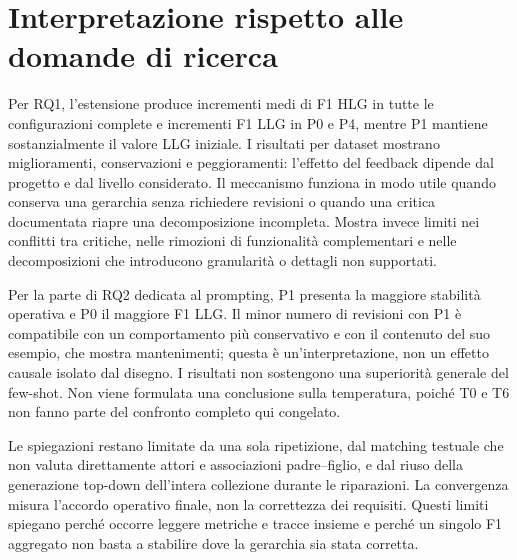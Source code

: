 \section{Interpretazione rispetto alle domande di ricerca}
Per RQ1, l'estensione produce incrementi medi di F1 HLG in tutte
le configurazioni complete e incrementi F1 LLG in P0 e P4, mentre
P1 mantiene sostanzialmente il valore LLG iniziale. I risultati per
dataset mostrano miglioramenti, conservazioni e peggioramenti:
l'effetto del feedback dipende dal progetto e dal livello considerato.
Il meccanismo funziona in modo utile quando conserva una gerarchia
senza richiedere revisioni o quando una critica documentata riapre
una decomposizione incompleta. Mostra invece limiti nei conflitti
tra critiche, nelle rimozioni di funzionalit\`a complementari e nelle
decomposizioni che introducono granularit\`a o dettagli non supportati.

Per la parte di RQ2 dedicata al prompting, P1 presenta la maggiore
stabilit\`a operativa e P0 il maggiore F1 LLG. Il minor numero di
revisioni con P1 \`e compatibile con un comportamento pi\`u conservativo
e con il contenuto del suo esempio, che mostra mantenimenti; questa
\`e un'interpretazione, non un effetto causale isolato dal disegno.
I risultati non sostengono una superiorit\`a generale del few-shot.
Non viene formulata una conclusione sulla temperatura, poich\'e
T0 e T6 non fanno parte del confronto completo qui congelato.

Le spiegazioni restano limitate da una sola ripetizione, dal matching
testuale che non valuta direttamente attori e associazioni padre--figlio,
e dal riuso della generazione top-down dell'intera collezione durante
le riparazioni. La convergenza misura l'accordo operativo finale,
non la correttezza dei requisiti. Questi limiti spiegano perch\'e
occorre leggere metriche e tracce insieme e perch\'e un singolo F1
aggregato non basta a stabilire dove la gerarchia sia stata corretta.

